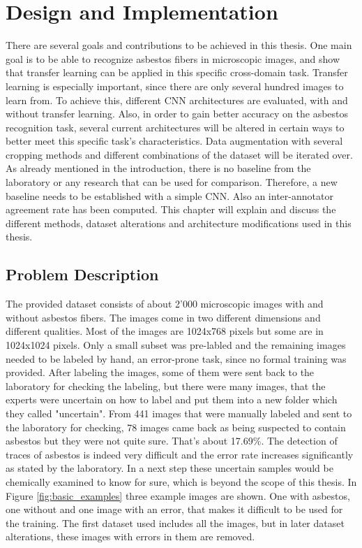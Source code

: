 \chapter{Design and Implementation}


There are several goals and contributions to be achieved in this thesis. One main goal is to be able to recognize asbestos fibers in microscopic images, and show that transfer learning can be applied in this specific cross-domain task. Transfer learning is especially important, since there are only several hundred images to learn from. To achieve this, different CNN architectures are evaluated, with and without transfer learning. Also, in order to gain better accuracy on the asbestos recognition task, several current architectures will be altered in certain ways to better meet this specific task's characteristics. Data augmentation with several cropping methods and different combinations of the dataset will be iterated over. As already mentioned in the introduction, there is no baseline from the laboratory or any research that can be used for comparison. Therefore, a new baseline needs to be established with a simple CNN. Also an inter-annotator agreement rate has been computed. This chapter will explain and discuss the different methods, dataset alterations and architecture modifications used in this thesis. 

\section{Problem Description}

The provided dataset consists of about 2'000 microscopic images with and without asbestos fibers. The images come in two different dimensions and different qualities. Most of the images are 1024x768 pixels but some are in 1024x1024 pixels. Only a small subset was pre-labled and the remaining images needed to be labeled by hand, an error-prone task, since no formal training was provided. After labeling the images, some of them were sent back to the laboratory for checking the labeling, but there were many images, that the experts were uncertain on how to label and put them into a new folder which they called  "uncertain". From 441 images that were manually labeled and sent to the laboratory for checking, 78 images came back as being suspected to contain asbestos but they were not quite sure. That's about 17.69\%. The detection of traces of asbestos is indeed very difficult and the error rate increases significantly as stated by the laboratory. In a next step these uncertain samples would be chemically examined to know for sure, which is beyond the scope of this thesis. In Figure \ref{fig:basic_examples} three example images are shown. One with asbestos, one without and one image with an error, that makes it difficult to be used for the training. The first dataset used includes all the images, but in later dataset alterations, these images with errors in them are removed.

